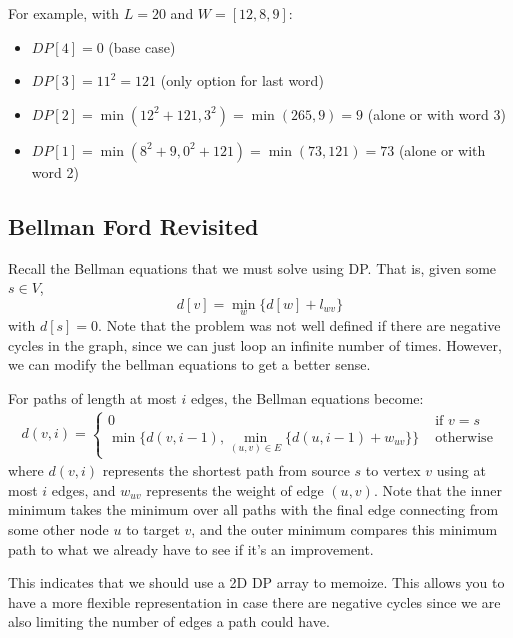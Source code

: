   \begin{example}
    For example, with $L=20$ and $W=[12,8,9]$:
    \begin{itemize}
      \item $DP[4] = 0$ (base case)
      \item $DP[3] = 11^2 = 121$ (only option for last word)
      \item $DP[2] = \min(12^2 + 121, 3^2) = \min(265, 9) = 9$ (alone or with word 3)
      \item $DP[1] = \min(8^2 + 9, 0^2 + 121) = \min(73, 121) = 73$ (alone or with word 2)
    \end{itemize}
  \end{example}

\subsection{Bellman Ford Revisited} 

  Recall the Bellman equations that we must solve using DP. That is, given some $s \in V$, 
  \begin{equation}
    d[v] = \min_w \{ d[w] + l_{wv} \}
  \end{equation}
  with $d[s] = 0$. Note that the problem was not well defined if there are negative cycles in the graph, since we can just loop an infinite number of times. However, we can modify the bellman equations to get a better sense. 

  \begin{theorem}
    For paths of length at most $i$ edges, the Bellman equations become:
    \begin{align}
      d(v,i) = \begin{cases} 
        0 & \text{ if } v = s \\
        \min\{d(v,i-1), \min_{(u, v) \in E} \{d(u,i-1) + w_{uv}\}\} & \text{ otherwise}
      \end{cases}
    \end{align}
    where $d(v,i)$ represents the shortest path from source $s$ to vertex $v$ using at most $i$ edges, and $w_{uv}$ represents the weight of edge $(u, v)$. Note that the inner minimum takes the minimum over all paths with the final edge connecting from some other node $u$ to target $v$, and the outer minimum compares this minimum path to what we already have to see if it's an improvement. 
  \end{theorem} 

  This indicates that we should use a 2D DP array to memoize. This allows you to have a more flexible representation in case there are negative cycles since we are also limiting the number of edges a path could have. 

